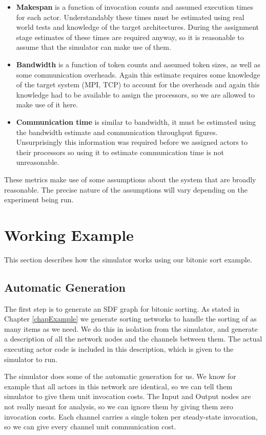 \begin{itemize}
	\item {\bf Makespan} is a function of invocation counts and assumed execution times for each actor.
			Understandably these times must be estimated using real world tests and knowledge of the target architectures.
			During the assignment stage estimates of these times are required anyway, so it is reasonable to assume that the simulator can make use of them.
	\item {\bf Bandwidth} is a function of token counts and assumed token sizes, as well as some communication overheads.
			Again this estimate requires some knowledge of the target system (MPI, TCP) to account for the overheads and again this knowledge had to be available to assign the processors, so we are allowed to make use of it here.
	\item {\bf Communication time} is similar to bandwidth, it must be estimated using the bandwidth estimate and communication throughput figures.
			Unsurprisingly this information was required before we assigned actors to their processors so using it to estimate communication time is not unreasonable.
\end{itemize}

These metrics make use of some assumptions about the system that are broadly reasonable.
The precise nature of the assumptions will vary depending on the experiment being run.

\section{Working Example}

This section describes how the simulator works using our bitonic sort example.

\subsection{Automatic Generation}

The first step is to generate an SDF graph for bitonic sorting.
As stated in Chapter \ref{chapExample} we generate sorting networks to handle the sorting of as many items as we need.
We do this in isolation from the simulator, and generate a description of all the network nodes and the channels between them.
The actual executing actor code is included in this description, which is given to the simulator to run.

The simulator does some of the automatic generation for us.
We know for example that all actors in this network are identical, so we can tell them simulator to give them unit invocation costs.
The Input and Output nodes are not really meant for analysis, so we can ignore them by giving them zero invocation costs.
Each channel carries a single token per steady-state invocation, so we can give every channel unit communication cost.

